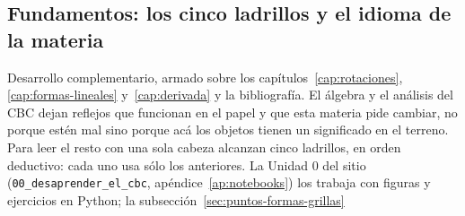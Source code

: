 \subsection{Fundamentos: los cinco ladrillos y el idioma de la materia}\label{sec:desaprender}

{\small\vspace{1mm}\par}


Desarrollo complementario, armado sobre los capítulos~\ref{cap:rotaciones},
\ref{cap:formas-lineales} y~\ref{cap:derivada} y la
bibliografía. El álgebra y el análisis del CBC dejan
reflejos que funcionan en el papel y que esta materia pide cambiar, no porque estén mal
sino porque acá los objetos tienen un significado en el terreno. Para leer el resto con una
sola cabeza alcanzan cinco ladrillos, en orden deductivo: cada uno usa sólo los anteriores.
La Unidad 0 del sitio (\texttt{00\_desaprender\_el\_cbc}, apéndice~\ref{ap:notebooks}) los
trabaja con figuras y ejercicios en Python; la subsección~\ref{sec:puntos-formas-grillas}
